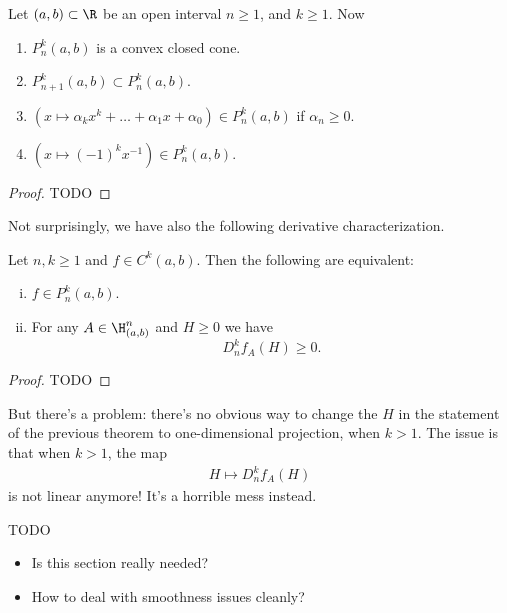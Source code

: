 \begin{prop}
	Let $(a, b) \subset \R$ be an open interval $n \geq 1$, and $k \geq 1$. Now
	\begin{enumerate}
		\item $P_{n}^{k}(a, b)$ is a convex closed cone.
		\item $P_{n + 1}^{k}(a, b) \subset P_{n}^{k}(a, b)$.
		\item $\left(x \mapsto \alpha_{k} x^{k} + \ldots + \alpha_{1} x + \alpha_{0}\right) \in P^{k}_{n}(a, b)$ if $\alpha_{n} \geq 0$.
		\item $\left(x \mapsto (-1)^k x^{-1}\right) \in P^{k}_{n}(a, b)$.
	\end{enumerate}
\end{prop}
\begin{proof}
	TODO
\end{proof}

Not surprisingly, we have also the following derivative characterization.

\begin{lause}
	Let $n, k \geq 1$ and $f \in C^{k}(a, b)$.
	Then the following are equivalent:
	\begin{enumerate}[(i)]
	\item $f \in P^{k}_{n}(a, b)$.
	\item For any $A \in \H^{n}_{(a, b)}$ and $H \geq 0$ we have
	\[
		D^{k}_{n}f_{A}(H) \geq 0.
	\]
	\end{enumerate}
\end{lause}
\begin{proof}
	TODO
\end{proof}

But there's a problem: there's no obvious way to change the $H$ in the statement of the previous theorem to one-dimensional projection, when $k > 1$. The issue is that when $k > 1$, the map
\begin{align*}
	H \mapsto D^{k}_{n}f_{A}(H)
\end{align*}
is not linear anymore! It's a horrible mess instead.

TODO

\begin{itemize}
	\item Is this section really needed?
	\item How to deal with smoothness issues cleanly?
\end{itemize}







